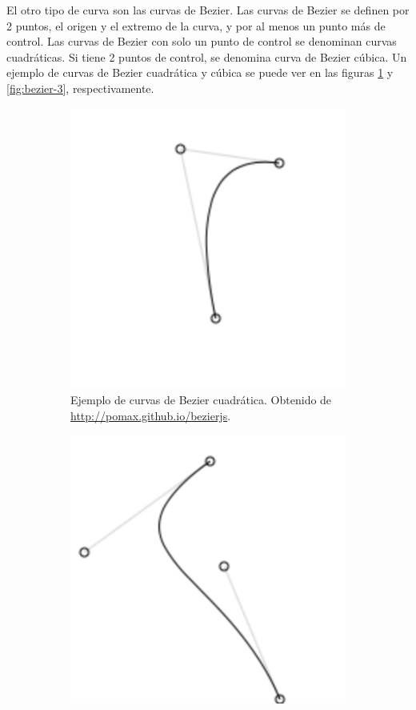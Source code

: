 El otro tipo de curva son las curvas de Bezier\cite{bezier-info}. Las curvas de Bezier se definen por 2 puntos, el origen y el extremo de la curva, y por al menos un punto más de control. Las curvas de Bezier con solo un punto de control se denominan curvas cuadráticas. Si tiene 2 puntos de control, se denomina curva de Bezier cúbica. Un ejemplo de curvas de Bezier cuadrática y cúbica se puede ver en las figuras \ref{fig:bezier-2} y \ref{fig:bezier-3}, respectivamente.


\begin{figure}[!ht]
	\begin{adjustwidth}{\oddsidemargin-1in}{\rightmargin}
			\begin{subfigure}{\paperwidth}
				\centering
				\includegraphics[scale=.5]{images/bezier-2.png}
	\caption{Ejemplo de curvas de Bezier cuadrática. Obtenido de \url{http://pomax.github.io/bezierjs}.}				
				\label{fig:bezier-2}
			\end{subfigure}
			\begin{subfigure}{\paperwidth}
				\centering
				\includegraphics[scale=.5]{images/bezier-3.png}

\end{subfigure}
\end{adjustwidth}
\end{figure}
